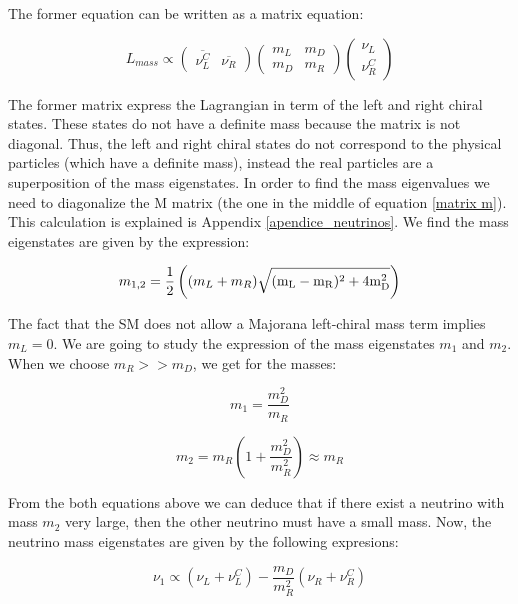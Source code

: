 The former equation can be written as a matrix equation: 

\begin{equation}\label{matrix m}
L_{mass} \propto
\begin{pmatrix} 
  \overline{\nu_L^C} & \overline{\nu_R}
\end{pmatrix}
\begin{pmatrix}
  m_L & m_D \\
  m_D & m_R  
\end{pmatrix}
\begin{pmatrix}
  \nu_L \\
  \nu_R^C  
\end{pmatrix}
\end{equation}

The former matrix express the Lagrangian in term of the left and right chiral states. These states do not have a definite mass because the matrix is not diagonal. Thus, the left and right chiral states do not correspond to the physical particles (which have a definite mass), instead the real particles are a superposition of the mass eigenstates. In order to find the mass eigenvalues we need to diagonalize the M matrix (the one in the middle of equation \ref{matrix m}). This calculation is explained is Appendix \ref{apendice_neutrinos}. We find the mass eigenstates are given by the expression:

\begin{equation}
m_{1,2} = \frac{1}{2} \left( (m_L + m_R) \rm \sqrt{(m_L - m_R)^2 + 4m_D^2} \right)
\end{equation}
 
The fact that the SM does not allow a Majorana left-chiral mass term implies $m_L = 0$. We are going to study the expression of the mass eigenstates $m_1$ and $m_2$. When we choose $m_R >> m_D$, we get for the masses:

\begin{equation}
m_1 = \frac{m_D^2}{m_R}
\end{equation}

\begin{equation}
m_2 = m_R \left( 1 + \frac{m_D^2}{m_R^2}\right) \approx m_R 
\end{equation}
 
From the both equations above we can deduce that if there exist a neutrino with mass $m_2$ very large, then the other neutrino must have a small mass. Now, the neutrino mass eigenstates are given by the following expresions:

\begin{equation}
\nu_1 \propto \left( \nu_L + \nu_L^C \right) - \frac{m_D}{m_R^2} \left( \nu_R + \nu_R^C \right)
\end{equation}

